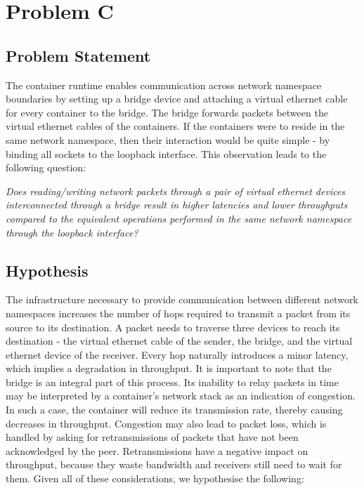 

\section{Problem C}
\label{ch:experiment/problem-c}
\subsection{Problem Statement}
The container runtime enables communication across network namespace boundaries 
by setting up a bridge device and attaching a virtual ethernet cable for every container to the bridge.
The bridge forwards packets between the virtual ethernet cables of the containers.
If the containers were to reside in the same network namespace, then their interaction would be 
quite simple - by binding all sockets to the loopback interface. 
This observation leads to the following question:

\textit{Does reading/writing network packets through a pair of virtual ethernet 
devices interconnected through a bridge result in higher latencies and lower throughputs 
compared to the equivalent operations performed in the same network namespace through the loopback interface?}

\subsection{Hypothesis}
The infrastructure necessary to provide communication between different network namespaces 
increases the number of hops required to transmit a packet from its source to its destination. 
A packet needs to traverse three devices to reach its destination - the virtual ethernet 
cable of the sender, the bridge, and the virtual ethernet device of the receiver. 
Every hop naturally introduces a minor latency, which implies a degradation in throughput.
It is important to note that the bridge is an integral part of this process. 
Its inability to relay packets in time may be interpreted by a container's network stack 
as an indication of congestion. In such a case, the container will reduce 
its transmission rate, thereby causing decreases in throughput. Congestion may also lead 
to packet loss, which is handled by asking for retransmissions of packets that have not been 
acknowledged by the peer. Retransmissions have a negative impact on throughput, because they 
waste bandwidth and receivers still need to wait for them. Given all of these considerations,
we hypothesise the following:

